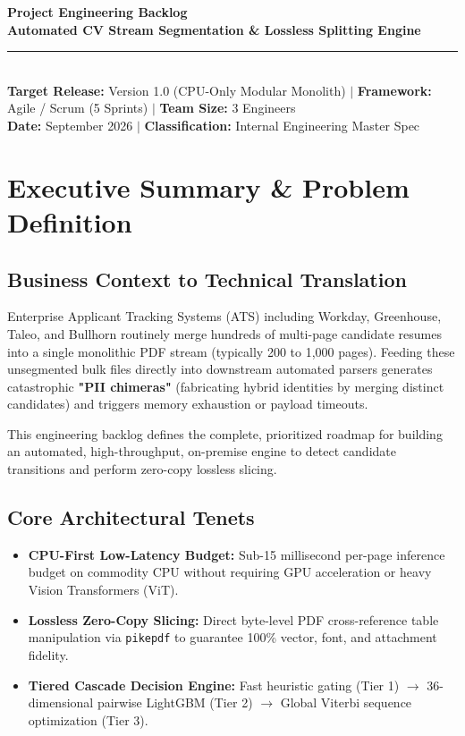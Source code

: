 \documentclass[11pt,a4paper]{article}
\begin{document}
\begin{center}
    {\Huge \textbf{\color{NavyBlue} Project Engineering Backlog}}\\[6pt]
    {\Large \textbf{\color{SlateGray} Automated CV Stream Segmentation \& Lossless Splitting Engine}}\\[8pt]
    \rule{\linewidth}{1pt}\\[6pt]
    \textbf{Target Release:} Version 1.0 (CPU-Only Modular Monolith) \quad $|$ \quad
    \textbf{Framework:} Agile / Scrum (5 Sprints) \quad $|$ \quad
    \textbf{Team Size:} 3 Engineers\\[3pt]
    \textbf{Date:} September 2026 \quad $|$ \quad \textbf{Classification:} Internal Engineering Master Spec
\end{center}

\vspace{0.5em}

\section{Executive Summary \& Problem Definition}

\subsection{Business Context to Technical Translation}
Enterprise Applicant Tracking Systems (ATS) including Workday, Greenhouse, Taleo, and Bullhorn routinely merge hundreds of multi-page candidate resumes into a single monolithic PDF stream (typically 200 to 1,000 pages). Feeding these unsegmented bulk files directly into downstream automated parsers generates catastrophic \textbf{"PII chimeras"} (fabricating hybrid identities by merging distinct candidates) and triggers memory exhaustion or payload timeouts. 

This engineering backlog defines the complete, prioritized roadmap for building an automated, high-throughput, on-premise engine to detect candidate transitions and perform zero-copy lossless slicing.

\subsection{Core Architectural Tenets}
\begin{itemize}[leftmargin=1.5em, itemsep=3pt]
    \item \textbf{CPU-First Low-Latency Budget:} Sub-15 millisecond per-page inference budget on commodity CPU without requiring GPU acceleration or heavy Vision Transformers (ViT).
    \item \textbf{Lossless Zero-Copy Slicing:} Direct byte-level PDF cross-reference table manipulation via \texttt{pikepdf} to guarantee 100\% vector, font, and attachment fidelity.
    \item \textbf{Tiered Cascade Decision Engine:} Fast heuristic gating (Tier 1) $\to$ 36-dimensional pairwise LightGBM (Tier 2) $\to$ Global Viterbi sequence optimization (Tier 3).
\end{itemize}
\end{document}
